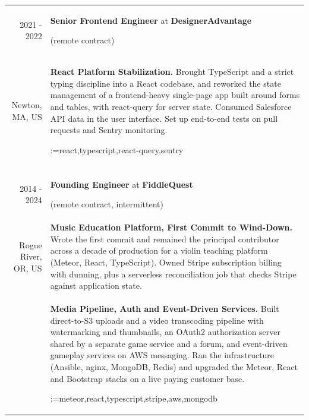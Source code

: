 \documentclass[letterpaper,10pt]{article}
\makeatletter
\newcommand{\sotag}[1]{\tikz[baseline]{\node[anchor=base, rounded corners=0.5ex, text height=1.5ex, text depth=.25ex, fill=tagbg, draw=tagbg, text=tagtxt] {#1};}}
\newcommand{\sotagrow}[1]{\par\vspace{4pt}\noindent\@for\sotagitem:=#1\do{\sotag{\sotagitem} }\\}
\newcommand{\job}[2]{\large\sffamily \textbf{#1} at \textbf{#2}\rule[-0.45em]{0pt}{1.45em}}
\newcommand{\sep}{\multicolumn{2}{c}{}\\}
\makeatother
\begin{document}
\begin{longtable}{r|p{}}
  \textsc{2021 - 2022} & \job{Senior Frontend Engineer}{DesignerAdvantage} (remote contract)\\
    {\small Newton, MA, US} &\textbf{React Platform Stabilization.} Brought TypeScript and a strict typing discipline into a React codebase, and reworked the state management of a frontend-heavy single-page app built around forms and tables, with react-query for server state. Consumed Salesforce API data in the user interface. Set up end-to-end tests on pull requests and Sentry monitoring.
    \sotagrow{react,typescript,react-query,sentry}\sep

  \textsc{2014 - 2024} & \job{Founding Engineer}{FiddleQuest} (remote contract, intermittent)\\
    {\small Rogue River, OR, US} &\textbf{Music Education Platform, First Commit to Wind-Down.} Wrote the first commit and remained the principal contributor across a decade of production for a violin teaching platform (Meteor, React, TypeScript). Owned Stripe subscription billing with dunning, plus a serverless reconciliation job that checks Stripe against application state.\\[0.4em]
    &\textbf{Media Pipeline, Auth and Event-Driven Services.} Built direct-to-S3 uploads and a video transcoding pipeline with watermarking and thumbnails, an OAuth2 authorization server shared by a separate game service and a forum, and event-driven gameplay services on AWS messaging. Ran the infrastructure (Ansible, nginx, MongoDB, Redis) and upgraded the Meteor, React and Bootstrap stacks on a live paying customer base.
    \sotagrow{meteor,react,typescript,stripe,aws,mongodb}
\end{longtable}
\end{document}
